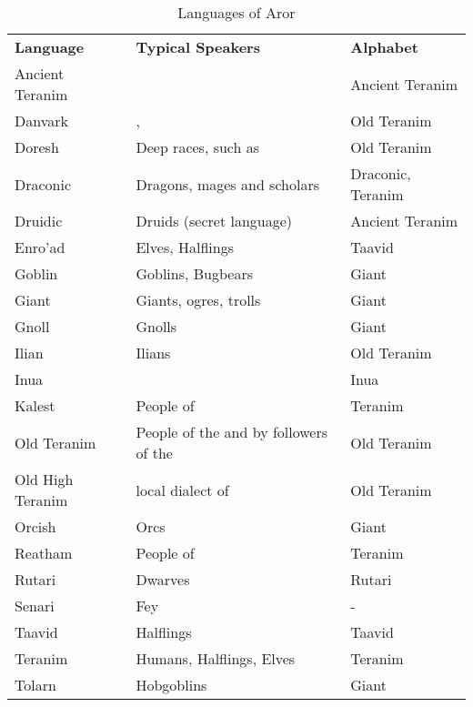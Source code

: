 \begin{table*}[!htb]
  \caption{Languages of Aror} \label{tbl:Languages}
  \begin{tabular}{l p{8cm} l}
    \textbf{Language} & \textbf{Typical Speakers} & \textbf{Alphabet} \\
    Ancient Teranim & \nameref{sec:Tynrikke}      & Ancient Teranim \\
    Danvark         & \nameref{sec:Morkan}, \nameref{sec:Norbury} & Old Teranim \\
    Doresh          & Deep races, such as \nameref{sec:Deepkin} & Old Teranim \\
    Draconic        & Dragons, mages and scholars & Draconic, Teranim \\
    Druidic         & Druids (secret language)    & Ancient Teranim \\
    Enro'ad         & Elves, Halflings            & Taavid \\
    Goblin          & Goblins, Bugbears           & Giant \\
    Giant           & Giants, ogres, trolls       & Giant \\
    Gnoll           & Gnolls                      & Giant \\
    Ilian           & Ilians                      & Old Teranim \\
    Inua            & \nameref{sec:Inua}          & Inua \\
    Kalest          & People of \nameref{sec:Arania} & Teranim \\
    Old Teranim     & People of the \nameref{sec:Dirgewood} and by followers of the \nameref{sec:Old Ways} & Old Teranim \\
    Old High Teranim& local dialect of\nameref{sec:Tredegar} & Old Teranim \\
    Orcish          & Orcs                        & Giant \\
    Reatham         & People of \nameref{sec:Forsby} & Teranim \\
    Rutari          & Dwarves                     & Rutari \\
    Senari          & Fey                         & - \\
    Taavid          & Halflings                   & Taavid \\
    Teranim         & Humans, Halflings, Elves    & Teranim \\
    Tolarn          & Hobgoblins                  & Giant \\
  \end{tabular}
\end{table*}

